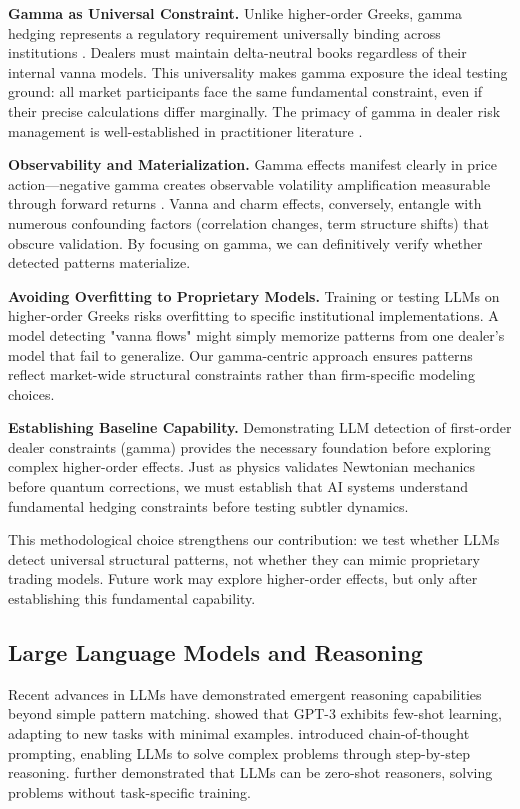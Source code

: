 \textbf{Gamma as Universal Constraint.} Unlike higher-order Greeks, gamma hedging represents a regulatory requirement universally binding across institutions \cite{mixon2009}. Dealers must maintain delta-neutral books regardless of their internal vanna models. This universality makes gamma exposure the ideal testing ground: all market participants face the same fundamental constraint, even if their precise calculations differ marginally. The primacy of gamma in dealer risk management is well-established in practitioner literature \cite{pearson2013}.

\textbf{Observability and Materialization.} Gamma effects manifest clearly in price action—negative gamma creates observable volatility amplification measurable through forward returns \cite{ni2022}. Vanna and charm effects, conversely, entangle with numerous confounding factors (correlation changes, term structure shifts) that obscure validation. By focusing on gamma, we can definitively verify whether detected patterns materialize.

\textbf{Avoiding Overfitting to Proprietary Models.} Training or testing LLMs on higher-order Greeks risks overfitting to specific institutional implementations. A model detecting "vanna flows" might simply memorize patterns from one dealer's model that fail to generalize. Our gamma-centric approach ensures patterns reflect market-wide structural constraints rather than firm-specific modeling choices.

\textbf{Establishing Baseline Capability.} Demonstrating LLM detection of first-order dealer constraints (gamma) provides the necessary foundation before exploring complex higher-order effects. Just as physics validates Newtonian mechanics before quantum corrections, we must establish that AI systems understand fundamental hedging constraints before testing subtler dynamics.

This methodological choice strengthens our contribution: we test whether LLMs detect universal structural patterns, not whether they can mimic proprietary trading models. Future work may explore higher-order effects, but only after establishing this fundamental capability.

\subsection{Large Language Models and Reasoning}

Recent advances in LLMs have demonstrated emergent reasoning capabilities beyond simple pattern matching. \cite{brown2020language} showed that GPT-3 exhibits few-shot learning, adapting to new tasks with minimal examples. \cite{wei2022chain} introduced chain-of-thought prompting, enabling LLMs to solve complex problems through step-by-step reasoning. \cite{kojima2022large} further demonstrated that LLMs can be zero-shot reasoners, solving problems without task-specific training.

